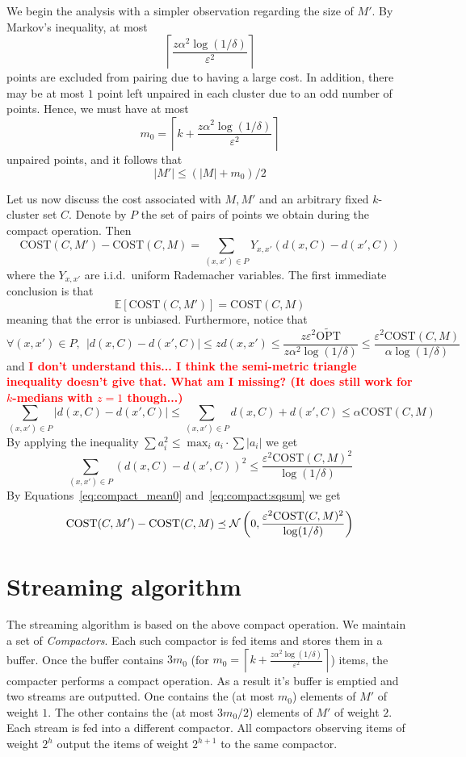 \documentclass[11pt]{article}
\newcommand{\ceil}[1]{\left \lceil #1 \right \rceil}
\newcommand{\E}{{\mathbb{E}}}
\newcommand{\eps}{\varepsilon}
\newcommand{\note}[1]{\textbf{\textcolor{red}{#1}}}
\newcommand{\cost}{\text{COST}}
\newcommand{\topt}{\widetilde{\text{OPT}}}
\newcommand{\N}{{\cal N}}
\begin{document}
We begin the analysis with a simpler observation regarding the size of $M'$. By Markov's inequality, at most 
$$\ceil{\frac{ z \alpha^2 \log(1/\delta)}{\eps^2}}$$
points are excluded from pairing due to having a large cost. In addition, there may be at most $1$ point left unpaired in each cluster due to an odd number of points. Hence, we must have at most 
$$m_0 = \ceil{k+\frac{ z \alpha^2 \log(1/\delta)}{\eps^2}}$$
unpaired points, and it follows that 
$$ |M'| \leq (|M|+m_0)/2 $$

Let us now discuss the cost associated with $M,M'$ and an arbitrary fixed $k$-cluster set $C$. Denote by $P$ the set of pairs of points we obtain during the compact operation. Then
$$ \cost(C,M') - \cost(C,M) = \sum_{(x,x') \in P} Y_{x,x'} \left( d(x,C) - d(x',C) \right) $$
where the $Y_{x,x'}$ are i.i.d.\ uniform Rademacher variables. The first immediate conclusion is that
\begin{equation} \label{eq:compact_mean0}
\E[\cost(C,M')] = \cost(C,M)
\end{equation}
meaning that the error is unbiased. Furthermore, notice that 
$$\forall (x,x') \in P, \ \ |d(x,C)-d(x',C)| \leq z d(x,x') \leq \frac{z \eps^2 \topt}{z \alpha^2 \log(1/\delta)} \leq \frac{\eps^2 \cost(C,M)}{ \alpha \log(1/\delta)}$$
and
\note{I don't understand this... I think the semi-metric triangle inequality doesn't give that. What am I missing? (It does still work for $k$-medians with $z=1$ though...)}
$$\sum_{(x,x') \in P}|d(x,C)-d(x',C)| \leq \sum_{(x,x') \in P} d(x,C) + d(x',C) \leq \alpha \cost(C,M)$$
By applying the inequality $\sum a_i^2 \leq \max_i a_i \cdot \sum |a_i|$ we get
\begin{equation} \label{eq:compact:sqsum}
\sum_{(x,x') \in P}\left( d(x,C)-d(x',C) \right)^2 \leq \frac{\eps^2 \cost(C,M)^2}{  \log(1/\delta)}
\end{equation}
By Equations~\eqref{eq:compact_mean0} and~\eqref{eq:compact:sqsum} we get
\begin{equation} \label{eq:compact_subg}
\cost(C,M') - \cost(C,M) \preceq \N \left(0,\frac{\eps^2 \cost(C,M)^2}{  \log(1/\delta)} \right)
\end{equation}

\section{Streaming algorithm}
The streaming algorithm is based on the above compact operation. We maintain a set of \emph{Compactors}. Each such compactor is fed items and stores them in a buffer. Once the buffer contains $3m_0$ (for $m_0 = \ceil{k+\frac{ z \alpha^2 \log(1/\delta)}{\eps^2}}$) items, the compacter performs a compact operation. As a result it's buffer is emptied and two streams are outputted. One contains the (at most $m_0$) elements of $M'$ of weight $1$. The other contains the (at most $3m_0/2$) elements of $M'$ of weight $2$. Each stream is fed into a different compactor. All compactors observing items of weight $2^h$ output the items of weight $2^{h+1}$ to the same compactor.
\end{document}
